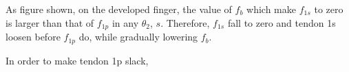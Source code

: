 \documentclass{llncs}
\begin{document}

	As figure shown, on the developed finger, the value of $f_b$ which make $f_{1s}$ to zero is larger than that of $f_{1p}$ in any $\theta_2$, $s$.
	Therefore, $f_{1s}$ fall to zero and tendon 1s loosen before $f_{1p}$ do, while gradually lowering $f_b$.

	In order to make tendon 1p slack, 


			

\end{document}
